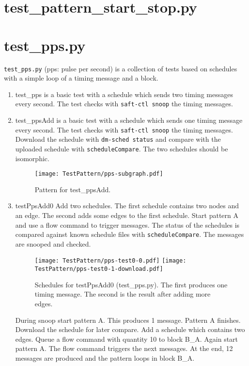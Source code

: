 \documentclass[12pt,a4paper]{report}
\begin{document}
\section{test\_pattern\_start\_stop.py}

\section{test\_pps.py}
\texttt{test\_pps.py} (pps: pulse per second) is a collection of tests based
on schedules with a simple loop of a timing message and a block.

\begin{enumerate}
\item test\_pps is a basic test with a
schedule which sends two timing messages every second. The test checks
with \texttt{saft-ctl snoop} the timing messages.

\item test\_ppsAdd is a basic test with a schedule which sends one timing
message every second. The test checks with \texttt{saft-ctl snoop} the timing
messages. Download the schedule with \texttt{dm-sched status} and compare
with the uploaded schedule with \texttt{scheduleCompare}. The two schedules
should be isomorphic.
    \begin{figure}
        \centering
        \texttt{[image: TestPattern/pps-subgraph.pdf]}
        \caption{Pattern for test\_ppsAdd.}
        \label{fig:Pattern_for_test_ppsAdd}
    \end{figure}

\item testPpsAdd0
    Add two schedules. The first schedule contains two nodes and an edge.
    The second adds some edges to the first schedule.
    Start pattern A and use a flow command to trigger messages.
    The status of the schedules is compared against known schedule files with
    \texttt{scheduleCompare}. The messages are snooped and checked.
    \begin{figure}
        \centering
        \texttt{[image: TestPattern/pps-test0-0.pdf]}
        \texttt{[image: TestPattern/pps-test0-1-download.pdf]}
        \caption{Schedules for testPpsAdd0 (test\_pps.py). The first produces
        one timing message. The second is the result after adding more edges.}
        \label{fig:Schedules_for_testPpsAdd0}
    \end{figure}
    During snoop start pattern A. This produces 1 message. Pattern A finishes.
    Download the schedule for later compare.
    Add a schedule which contains two edges.
    Queue a flow command with quantity 10 to block B\_A.
    Again start pattern A. The flow command triggers the next messages.
    At the end, 12 messages are produced and the pattern loops in block B\_A.


\end{enumerate}
\end{document}
